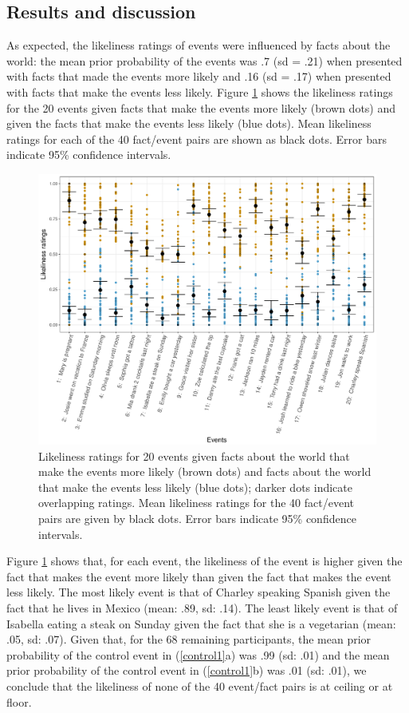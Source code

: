 \documentclass[11pt,fleqn]{article}
\newcommand{\6}{\mbox{$[\hspace*{-.6mm}[$}}
\newcommand{\9}{\mbox{$]\hspace*{-.6mm}]$}}
\begin{document}
\subsection{Results and discussion}

As expected, the likeliness ratings of events were influenced by facts about the world: the mean prior probability of the events was .7 (sd = .21) when presented with facts that made the events more likely and .16 (sd = .17) when presented with facts that make the events less likely. Figure \ref{f-priors} shows the likeliness ratings for the 20 events given facts that make the events more likely (brown dots) and given the facts that make the events less likely (blue dots). Mean likeliness ratings for each of the 40 fact/event pairs are shown as black dots. Error bars indicate 95\% confidence intervals.

\begin{figure}
\centering

\includegraphics[width=.8\paperwidth]{../results/1-prior/graphs/target-ratings}

\caption{Likeliness ratings for 20 events given facts about the world that make the events more likely (brown dots) and facts about the world that make the events less likely (blue dots); darker dots indicate overlapping ratings. Mean likeliness ratings for the 40 fact/event pairs are given by black dots. Error bars indicate 95\% confidence intervals.}\label{f-priors}
\end{figure}

Figure \ref{f-priors} shows that, for each event, the likeliness of the event is higher given the fact that makes the event more likely than given the fact that makes the event less likely. The most likely event is that of Charley speaking Spanish given the fact that he lives in Mexico (mean: .89, sd: .14). The least likely event is that of Isabella eating a steak on Sunday given the fact that she is a vegetarian (mean: .05, sd: .07). Given that, for the 68 remaining participants, the mean prior probability of the control event in (\ref{control1}a) was .99 (sd: .01) and the mean prior probability of the control event in (\ref{control1}b) was .01 (sd: .01), we conclude that the likeliness of none of the 40 event/fact pairs is at ceiling or at floor.
\end{document}
